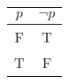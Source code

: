 \begin{tabular}{|c||c|}
\hline
$ p $ & $  \neg p $ \\
\hline
F & T \\
T & F \\
\hline
\end{tabular}
